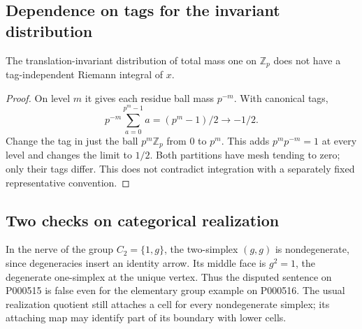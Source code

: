 \subsection{Dependence on tags for the invariant distribution}
\begin{proposition}[Item 1973-303.16]\ours\quad
The translation-invariant distribution of total mass one on \(\mathbb Z_p\)
does not have a tag-independent Riemann integral of \(x\).
\end{proposition}
\begin{proof}
On level \(m\) it gives each residue ball mass \(p^{-m}\). With canonical tags,
\[
 p^{-m}\sum_{a=0}^{p^m-1}a=(p^m-1)/2\longrightarrow-1/2.
\]
Change the tag in just the ball \(p^m\mathbb Z_p\) from \(0\) to \(p^m\). This
adds \(p^mp^{-m}=1\) at every level and changes the limit to \(1/2\). Both
partitions have mesh tending to zero; only their tags differ. This does not
contradict integration with a separately fixed representative convention.
\end{proof}

\subsection{Two checks on categorical realization}
\begin{example}\ours\quad
In the nerve of the group \(C_2=\{1,g\}\), the two-simplex \((g,g)\) is
nondegenerate, since degeneracies insert an identity arrow. Its middle face is
\(g^2=1\), the degenerate one-simplex at the unique vertex. Thus the disputed
sentence on P000515 is false even for the elementary group example on P000516.
The usual realization quotient still attaches a cell for every nondegenerate
simplex; its attaching map may identify part of its boundary with lower cells.
\end{example}

